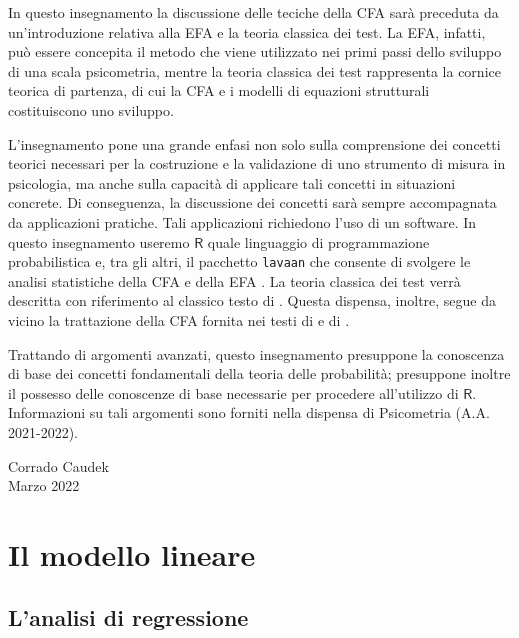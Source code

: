 \documentclass[
  11pt,
]{krantz}
\theoremstyle{definition}
\theoremstyle{definition}
\theoremstyle{definition}
\theoremstyle{definition}
\theoremstyle{remark}
\begin{document}
In questo insegnamento la discussione delle teciche della CFA sarà preceduta da un'introduzione relativa alla EFA e la teoria classica dei test. La EFA, infatti, può essere concepita il metodo che viene utilizzato nei primi passi dello sviluppo di una scala psicometria, mentre la teoria classica dei test rappresenta la cornice teorica di partenza, di cui la CFA e i modelli di equazioni strutturali costituiscono uno sviluppo.

L'insegnamento pone una grande enfasi non solo sulla comprensione dei concetti teorici necessari per la costruzione e la validazione di uno strumento di misura in psicologia, ma anche sulla capacità di applicare tali concetti in situazioni concrete. Di conseguenza, la discussione dei concetti sarà sempre accompagnata da applicazioni pratiche. Tali applicazioni richiedono l'uso di un software. In questo insegnamento useremo \(\textsf{R}\) \citep{rmanual} quale linguaggio di programmazione probabilistica e, tra gli altri, il pacchetto \texttt{lavaan} che consente di svolgere le analisi statistiche della CFA e della EFA \citep{beaujean2014latent}. La teoria classica dei test verrà descritta con riferimento al classico testo di \citet{lord1968statistical}. Questa dispensa, inoltre, segue da vicino la trattazione della CFA fornita nei testi di \citet{mcdonald2013test} e di \citet{brown2015confirmatory}.

Trattando di argomenti avanzati, questo insegnamento presuppone la conoscenza di base dei concetti fondamentali della teoria delle probabilità; presuppone inoltre il possesso delle conoscenze di base necessarie per procedere all'utilizzo di \(\textsf{R}\). Informazioni su tali argomenti sono forniti nella dispensa di Psicometria (A.A. 2021-2022).

\begin{flushright}
Corrado Caudek\\
Marzo 2022 \end{flushright}

\mainmatter

\hypertarget{part-il-modello-lineare}{%
\part{Il modello lineare}\label{part-il-modello-lineare}}

\hypertarget{lanalisi-di-regressione}{%
\chapter{L'analisi di regressione}\label{lanalisi-di-regressione}}
\end{document}
